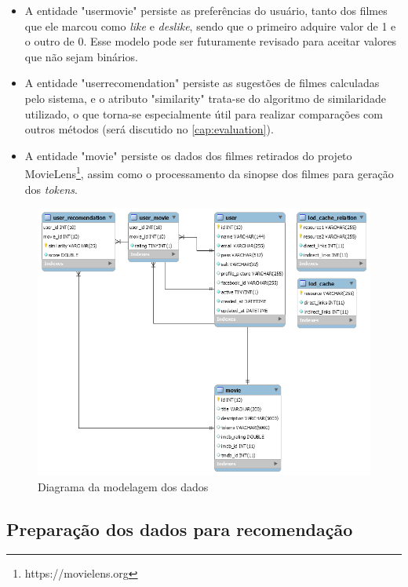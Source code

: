 \begin{itemize}
	\item{A entidade "user\textunderscore movie" persiste as preferências do usuário, tanto dos filmes que ele marcou como \textit{like} e \textit{deslike}, sendo que o primeiro adquire valor de 1 e o outro de 0. Esse modelo pode ser futuramente revisado para aceitar valores que não sejam binários.}
	
	\item{A entidade "user\textunderscore recomendation" persiste as sugestões de filmes calculadas pelo sistema, e o atributo "similarity" trata-se do algoritmo de similaridade utilizado, o que torna-se especialmente útil para realizar comparações com outros métodos (será discutido no \ref{cap:evaluation})}.
	
	\item{A entidade "movie" persiste os dados dos filmes retirados do projeto MovieLens\footnote{https://movielens.org}, assim como o processamento da sinopse dos filmes para geração dos \textit{tokens}.}
\end{itemize}

\begin{figure}
	\centering
	\includegraphics[scale=0.5]{imagens/user_model.png}
	\caption{Diagrama da modelagem dos dados}
	\label{fig:user_model}
\end{figure}
\label{ssec:dataModel}

\subsection{Preparação dos dados para recomendação}


